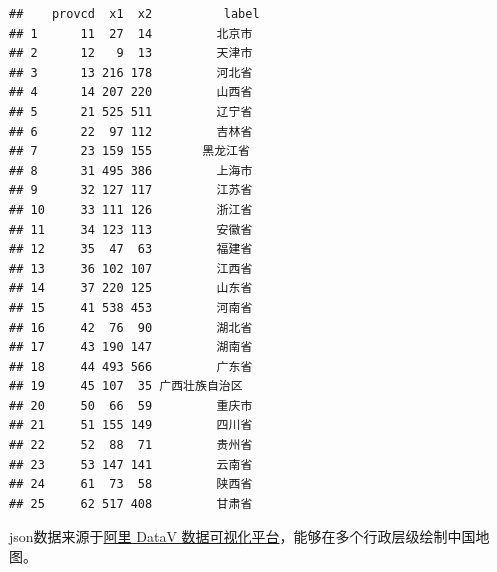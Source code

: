 \documentclass[
  oneside]{book}
\newenvironment{Shaded}{\begin{snugshade}}{\end{snugshade}}
\newcommand{\AttributeTok}[1]{\textcolor[rgb]{0.13,0.29,0.53}{#1}}
\newcommand{\FunctionTok}[1]{\textcolor[rgb]{0.13,0.29,0.53}{\textbf{#1}}}
\newcommand{\NormalTok}[1]{#1}
\newcommand{\OtherTok}[1]{\textcolor[rgb]{0.56,0.35,0.01}{#1}}
\newcommand{\SpecialCharTok}[1]{\textcolor[rgb]{0.81,0.36,0.00}{\textbf{#1}}}
\newcommand{\StringTok}[1]{\textcolor[rgb]{0.31,0.60,0.02}{#1}}
\begin{document}
\begin{Shaded}
\end{Shaded}

\begin{verbatim}
##    provcd  x1  x2          label
## 1      11  27  14         北京市
## 2      12   9  13         天津市
## 3      13 216 178         河北省
## 4      14 207 220         山西省
## 5      21 525 511         辽宁省
## 6      22  97 112         吉林省
## 7      23 159 155       黑龙江省
## 8      31 495 386         上海市
## 9      32 127 117         江苏省
## 10     33 111 126         浙江省
## 11     34 123 113         安徽省
## 12     35  47  63         福建省
## 13     36 102 107         江西省
## 14     37 220 125         山东省
## 15     41 538 453         河南省
## 16     42  76  90         湖北省
## 17     43 190 147         湖南省
## 18     44 493 566         广东省
## 19     45 107  35 广西壮族自治区
## 20     50  66  59         重庆市
## 21     51 155 149         四川省
## 22     52  88  71         贵州省
## 23     53 147 141         云南省
## 24     61  73  58         陕西省
## 25     62 517 408         甘肃省
\end{verbatim}

json数据来源于\href{http://datav.aliyun.com/portal/school/atlas/area_selector}{阿里 DataV 数据可视化平台}，能够在多个行政层级绘制中国地图。
\end{document}
